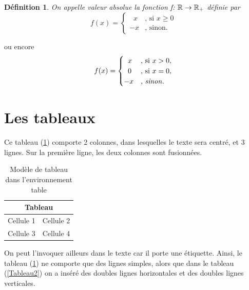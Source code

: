 \documentclass[10pt]{article}
\newtheorem{definition}{Définition}
\begin{document}
\begin{definition}
On appelle valeur absolue la fonction
{f}: $\Bbb{R} \rightarrow \Bbb{R}_+$ définie par
\[f(x)=
\begin{cases}
\;\;x & \text{, si } x \geq 0 \\
-x & \text{, sinon}.
\end{cases}
\]
\end{definition}

ou encore \[f(x)=
\begin{cases}
\; \;x & \text{, si } x > 0, \\
\; \;0& \text{, si } x = 0, \\
-x & \text{, \emph{sinon}}.
\end{cases}
\]

\hypertarget{les-tableaux}{%
\section{\texorpdfstring{Les tableaux
\label{tab}}{Les tableaux }}\label{les-tableaux}}

\bigskip

Ce tableau (\ref{Tableau1}) comporte 2 colonnes, dans lesquelles le
texte sera centré, et 3 lignes. Sur la première ligne, les deux colonnes
sont fusionnées.

\begin{table}[ht]
\begin{center}
\begin{tabular}{|c|c|}
\hline
\multicolumn{2}{|c|}{Tableau}\\
\hline
Cellule 1&Cellule 2\\
\hline
Cellule 3&Cellule 4\\
\hline
\end{tabular}
\end{center}
\caption{ \label{Tableau1} {Modèle de tableau dans l'environnement table} }
\end{table}

On peut l'invoquer ailleurs dans le texte car il porte une étiquette.
Ainsi, le tableau (\ref{Tableau1}) ne comporte que des lignes simples,
alors que dans le tableau (\ref{Tableau2}) on a inséré des doubles
lignes horizontales et des doubles lignes verticales.
\end{document}

